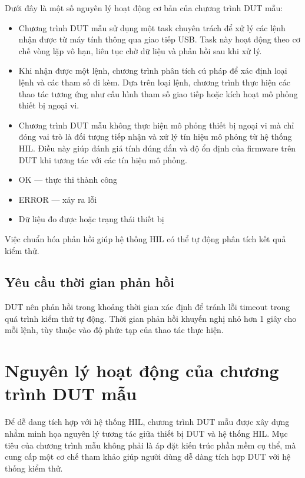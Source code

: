 Dưới đây là một số nguyên lý hoạt động cơ bản của chương trình DUT mẫu:
\begin{itemize}
    \item Chương trình DUT mẫu sử dụng một task chuyên trách để xử lý các lệnh nhận được từ máy tính thông qua giao tiếp USB. Task này hoạt động theo cơ chế vòng lặp vô hạn, liên tục chờ dữ liệu và phản hồi sau khi xử lý.
    \item Khi nhận được một lệnh, chương trình phân tích cú pháp để xác định loại lệnh và các tham số đi kèm. Dựa trên loại lệnh, chương trình thực hiện các thao tác tương ứng như cấu hình tham số giao tiếp hoặc kích hoạt mô phỏng thiết bị ngoại vi.
    \item Chương trình DUT mẫu không thực hiện mô phỏng thiết bị ngoại vi mà chỉ đóng vai trò là đối tượng tiếp nhận và xử lý tín hiệu mô phỏng từ hệ thống HIL. Điều này giúp đánh giá tính đúng đắn và độ ổn định của firmware trên DUT khi tương tác với các tín hiệu mô phỏng.
\item OK — thực thi thành công
\item ERROR — xảy ra lỗi
\item Dữ liệu đo được hoặc trạng thái thiết bị
\end{itemize}

Việc chuẩn hóa phản hồi giúp hệ thống HIL có thể tự động phân tích kết quả kiểm thử.

\subsection{Yêu cầu thời gian phản hồi}

DUT nên phản hồi trong khoảng thời gian xác định để tránh lỗi timeout trong quá trình kiểm thử tự động. Thời gian phản hồi khuyến nghị nhỏ hơn 1 giây cho mỗi lệnh, tùy thuộc vào độ phức tạp của thao tác thực hiện.

\section{Nguyên lý hoạt động của chương trình DUT mẫu}

Để dễ dang tích hợp với hệ thống HIL, chương trình DUT mẫu được xây dựng nhằm minh họa nguyên lý tương tác giữa thiết bị DUT và hệ thống HIL. Mục tiêu của chương trình mẫu không phải là áp đặt kiến trúc phần mềm cụ thể, mà cung cấp một cơ chế tham khảo giúp người dùng dễ dàng tích hợp DUT với hệ thống kiểm thử.

